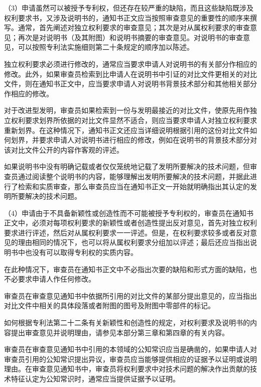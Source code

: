 {\setlength{\parindent}{17.1bp}（3）申请虽然可以被授予专利权，但还存在较严重的缺陷，而且这些缺陷既涉及权利要求书，又涉及说明书的，通知书正文应当按照审查意见的重要性的顺序来撰写。通常，首先阐述对独立权利要求的审查意见；其次是对从属权利要求的审查意见；再次是对说明书（及其附图）和说明书摘要的审查意见。对说明书的审查意见，可以按照专利法实施细则第二十条规定的顺序加以陈述。\par}

独立权利要求必须进行修改的，通常应当要求申请人对说明书的有关部分作相应的修改。此外，如果审查员检索到比申请人在说明书中引证的对比文件更相关的对比文件，则在通知书正文中，应当要求申请人对说明书背景技术部分和其他相关部分作相应的修改。

对于改进型发明，审查员如果检索到一份与发明最接近的对比文件，使原先用作独立权利要求划界所依据的对比文件显然不适合，则应当要求申请人对独立权利要求重新划界。在这种情况下，通知书正文还应当详细说明根据引用的这份对比文件如何划界，并要求申请人对说明书进行相应的修改，例如在说明书的背景技术部分对该对比文件公开的内容作客观的评述。

如果说明书中没有明确记载或者仅仅笼统地记载了发明所要解决的技术问题，但审查员通过阅读整个说明书的内容，能够理解出发明所要解决的技术问题，并据此进行了检索和实质审查，那么审查员应当在通知书正文一开始就明确指出其认定的发明所要解决的技术问题。

{\setlength{\parindent}{17.1bp}（4）申请由于不具备新颖性或创造性而不可能被授予专利权的，审查员在通知书正文中，必须对每项权利要求的新颖性或者创造性提出反对意见，首先对独立权利要求进行评述，然后对从属权利要求一一评述。但是，在权利要求较多或者反对意见的理由相同的情况下，也可以将从属权利要求分组加以评述；最后还应当指出说明书中也没有可以取得专利权的实质内容。\par}

在此种情况下，审查员在通知书正文中不必指出次要的缺陷和形式方面的缺陷，也不必要求申请人作任何修改。

审查员在审查意见通知书中依据所引用的对比文件的某部分提出意见的，应当指出对比文件中相关的具体段落或者附图的图号及附图中零部件的标记。

如何根据专利法第二十二条有关新颖性和创造性的规定，对权利要求及说明书的内容提出审查意见并说明理由，请参见本部分第三章和第四章的有关内容。

审查员在审查意见通知书中引用的本领域的公知常识应当是确凿的，如果申请人对审查员引用的公知常识提出异议，审查员应当能够提供相应的证据予以证明或说明理由。在审查意见通知书中，审查员将权利要求中对技术问题的解决作出贡献的技术特征认定为公知常识时，通常应当提供证据予以证明。


